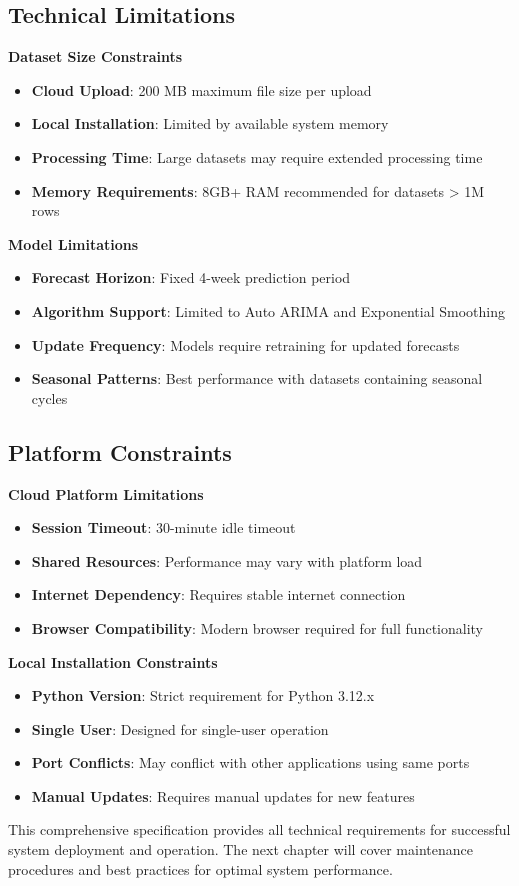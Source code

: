 \subsection{Technical Limitations}

\textbf{Dataset Size Constraints}
\begin{itemize}
	\item \textbf{Cloud Upload}: 200 MB maximum file size per upload
	\item \textbf{Local Installation}: Limited by available system memory
	\item \textbf{Processing Time}: Large datasets may require extended processing time
	\item \textbf{Memory Requirements}: 8GB+ RAM recommended for datasets > 1M rows
\end{itemize}

\textbf{Model Limitations}
\begin{itemize}
	\item \textbf{Forecast Horizon}: Fixed 4-week prediction period
	\item \textbf{Algorithm Support}: Limited to Auto ARIMA and Exponential Smoothing
	\item \textbf{Update Frequency}: Models require retraining for updated forecasts
	\item \textbf{Seasonal Patterns}: Best performance with datasets containing seasonal cycles
\end{itemize}

\subsection{Platform Constraints}

\textbf{Cloud Platform Limitations}
\begin{itemize}
	\item \textbf{Session Timeout}: 30-minute idle timeout
	\item \textbf{Shared Resources}: Performance may vary with platform load
	\item \textbf{Internet Dependency}: Requires stable internet connection
	\item \textbf{Browser Compatibility}: Modern browser required for full functionality
\end{itemize}

\textbf{Local Installation Constraints}
\begin{itemize}
	\item \textbf{Python Version}: Strict requirement for Python 3.12.x
	\item \textbf{Single User}: Designed for single-user operation
	\item \textbf{Port Conflicts}: May conflict with other applications using same ports
	\item \textbf{Manual Updates}: Requires manual updates for new features
\end{itemize}

This comprehensive specification provides all technical requirements for successful system deployment and operation. The next chapter will cover maintenance procedures and best practices for optimal system performance.